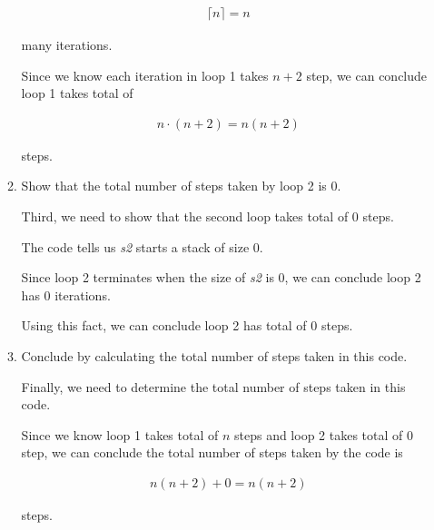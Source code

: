 \documentclass[12pt]{article}
\begin{document}
\begin{enumerate}[a.]
\begin{mdframed}
\begin{enumerate}[1.]
\begin{mdframed}
            \begin{align}
                \lceil n \rceil = n
            \end{align}

            many iterations.

            \bigskip

            Since we know each iteration in loop 1 takes $n+2$ step, we can conclude
            loop 1 takes total of

            \begin{align}
                n \cdot (n+2) = n(n+2)
            \end{align}

            steps.

            \end{mdframed}

            \item Show that the total number of steps taken by loop 2 is 0.

            \bigskip

            \begin{mdframed}
            Third, we need to show that the second loop takes total of 0 steps.

            \bigskip

            The code tells us \textit{s2} starts a stack of size 0.

            \bigskip

            Since loop 2 terminates when the size of \textit{s2} is 0,
            we can conclude loop 2 has 0 iterations.

            \bigskip

            Using this fact, we can conclude loop 2 has total of 0 steps.
            \end{mdframed}

            \item Conclude by calculating the total number of steps taken in this code.

            \begin{mdframed}
            Finally, we need to determine the total number of steps taken in this code.

            \bigskip

            Since we know loop 1 takes total of $n$ steps and loop 2 takes total of 0 step, we can
            conclude the total number of steps taken by the code is

            \begin{align}
                n(n+2) + 0 = n(n+2)
            \end{align}

            steps.
            \end{mdframed}
        \end{enumerate}


    \end{mdframed}

\end{enumerate}
\end{document}

